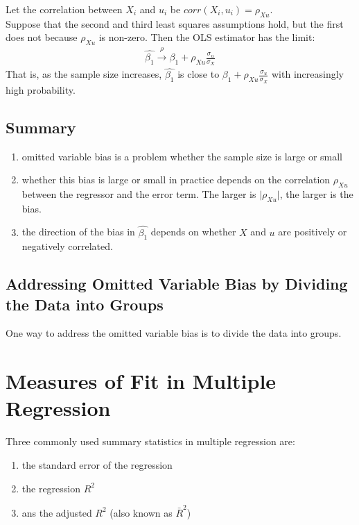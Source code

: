 Let the correlation between $X_{i}$ and $u_{i}$ be $corr\left(X_{i}, u_{i}\right) = \rho_{Xu}$.\\
Suppose that the second and third least squares assumptions hold, but the first does not because $\rho_{Xu}$ is non-zero. Then the OLS estimator has the limit:
\begin{eqnarray}
\hat{\beta_{1}} \overset{\rho}{\longrightarrow} \beta_{1} + \rho_{Xu}\frac{\sigma_{u}}{\sigma_{X}}
\end{eqnarray}
That is, as the sample size increases, $\hat{\beta_{1}}$ is close to $\beta_{1} + \rho_{Xu}\frac{\sigma_{u}}{\sigma_{X}}$ with increasingly high probability.

\subsection{Summary}
\begin{enumerate}
	\item omitted variable bias is a problem whether the sample size is large or small
	\item whether this bias is large or small in practice depends on the correlation $\rho_{Xu}$ between the regressor and the error term. The larger is $\vert\rho_{Xu}\vert$, the larger is the bias.
	\item the direction of the bias in $\hat{\beta_{1}}$ depends on whether $X$ and $u$ are positively or negatively correlated.
\end{enumerate}

\subsection{Addressing Omitted Variable Bias by Dividing the Data into Groups}
One way to address the omitted variable bias is to divide the data into groups.

\section{Measures of Fit in Multiple Regression}
Three commonly used summary statistics in multiple regression are:
\begin{enumerate}
	\item the standard error of the regression
	\item the regression $R^{2}$
	\item ans the adjusted $R^{2}$ (also known as $\bar{R}^{2}$)
\end{enumerate}

